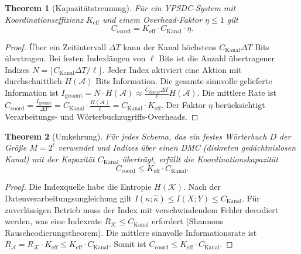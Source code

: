 \documentclass[12pt]{article}
\newtheorem{theorem}{Theorem}
\begin{document}
	\begin{theorem}[Kapazitätstrennung]
		\label{thm:capacity-separation}
		Für ein YPSDC-System mit Koordinationseffizienz \(K_{\mathrm{eff}}\) und einem Overhead-Faktor \(\eta \le 1\) gilt
		\begin{equation}
			\boxed{C_{\mathrm{coord}} = K_{\mathrm{eff}} \cdot C_{\mathrm{Kanal}} \cdot \eta}.
			\label{eq:capacity-separation}
		\end{equation}
	\end{theorem}
	
	\begin{proof}
		Über ein Zeitintervall \(\Delta T\) kann der Kanal höchstens \(C_{\mathrm{Kanal}} \Delta T\) Bits übertragen. Bei festen Indexlängen von \(\ell\) Bits ist die Anzahl übertragener Indizes \(N = \lfloor C_{\mathrm{Kanal}} \Delta T / \ell \rfloor\). Jeder Index aktiviert eine Aktion mit durchschnittlich \(H(\mathcal{A})\) Bits Information. Die gesamte sinnvolle gelieferte Information ist \(I_{\mathrm{gesamt}} = N \cdot H(\mathcal{A}) \approx \frac{C_{\mathrm{Kanal}} \Delta T}{\ell} H(\mathcal{A})\). Die mittlere Rate ist \(C_{\mathrm{coord}} = \frac{I_{\mathrm{gesamt}}}{\Delta T} = C_{\mathrm{Kanal}} \cdot \frac{H(\mathcal{A})}{\ell} = C_{\mathrm{Kanal}} \cdot K_{\mathrm{eff}}\). Der Faktor \(\eta\) berücksichtigt Verarbeitungs- und Wörterbuchzugriffs-Overheads.
	\end{proof}
	
	\begin{theorem}[Umkehrung]
		Für jedes Schema, das ein festes Wörterbuch \(D\) der Größe \(M = 2^\ell\) verwendet und Indizes über einen DMC (diskreten gedächtnislosen Kanal) mit der Kapazität \(C_{\mathrm{Kanal}}\) überträgt, erfüllt die Koordinationskapazität
		\[
		C_{\mathrm{coord}} \le K_{\mathrm{eff}} \cdot C_{\mathrm{Kanal}}.
		\]
	\end{theorem}
	
	\begin{proof}
		Die Indexquelle habe die Entropie \(H(\mathcal{K})\). Nach der Datenverarbeitungsungleichung gilt \(I(\kappa;\hat{\kappa}) \le I(X;Y) \le C_{\mathrm{Kanal}}\). Für zuverlässigen Betrieb muss der Index mit verschwindendem Fehler decodiert werden, was eine Indexrate \(R_{\mathcal{K}} \le C_{\mathrm{Kanal}}\) erfordert (Shannons Rauschcodierungstheorem). Die mittlere sinnvolle Informationsrate ist \(R_{\mathcal{A}} = R_{\mathcal{K}} \cdot K_{\mathrm{eff}} \le K_{\mathrm{eff}} \cdot C_{\mathrm{Kanal}}\). Somit ist \(C_{\mathrm{coord}} \le K_{\mathrm{eff}} \cdot C_{\mathrm{Kanal}}\).
	\end{proof}
	
\end{document}
